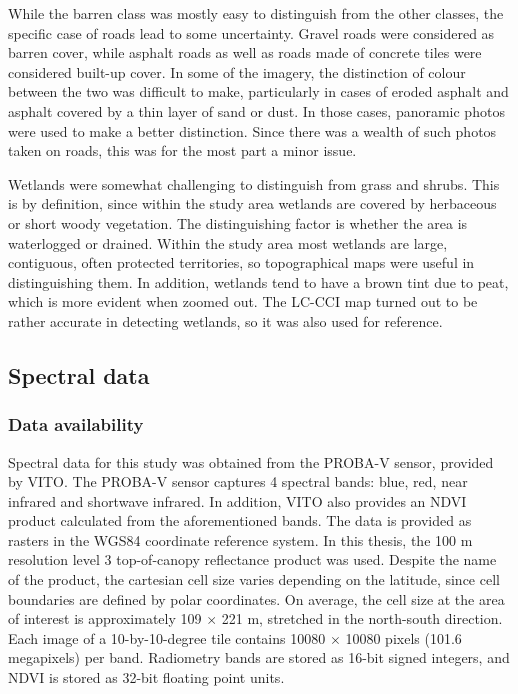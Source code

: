 \documentclass[a4paper,12pt]{scrbook}
\begin{document}
While the barren class was mostly easy to distinguish from the other classes, the specific case of roads lead to some uncertainty. Gravel roads were considered as barren cover, while asphalt roads as well as roads made of concrete tiles were considered built-up cover. In some of the imagery, the distinction of colour between the two was difficult to make, particularly in cases of eroded asphalt and asphalt covered by a thin layer of sand or dust. In those cases, panoramic photos were used to make a better distinction. Since there was a wealth of such photos taken on roads, this was for the most part a minor issue.

Wetlands were somewhat challenging to distinguish from grass and shrubs. This is by definition, since within the study area wetlands are covered by herbaceous or short woody vegetation. The distinguishing factor is whether the area is waterlogged or drained. Within the study area most wetlands are large, contiguous, often protected territories, so topographical maps were useful in distinguishing them. In addition, wetlands tend to have a brown tint due to peat, which is more evident when zoomed out. The LC-CCI map turned out to be rather accurate in detecting wetlands, so it was also used for reference.

\subsection{Spectral data}
\label{sec-spectral}

\subsubsection{Data availability}

Spectral data for this study was obtained from the PROBA-V sensor, provided by VITO. The PROBA-V sensor captures 4 spectral bands: blue, red, near infrared and shortwave infrared. In addition, VITO also provides an NDVI product calculated from the aforementioned bands. The data is provided as rasters in the WGS84 coordinate reference system. In this thesis, the 100 m resolution level 3 top-of-canopy reflectance product was used. Despite the name of the product, the cartesian cell size varies depending on the latitude, since cell boundaries are defined by polar coordinates. On average, the cell size at the area of interest is approximately 109 $\times{}$ 221 m, stretched in the north-south direction. Each image of a 10-by-10-degree tile contains 10080 $\times{}$ 10080 pixels (101.6 megapixels) per band. Radiometry bands are stored as 16-bit signed integers, and NDVI is stored as 32-bit floating point units.
\end{document}
